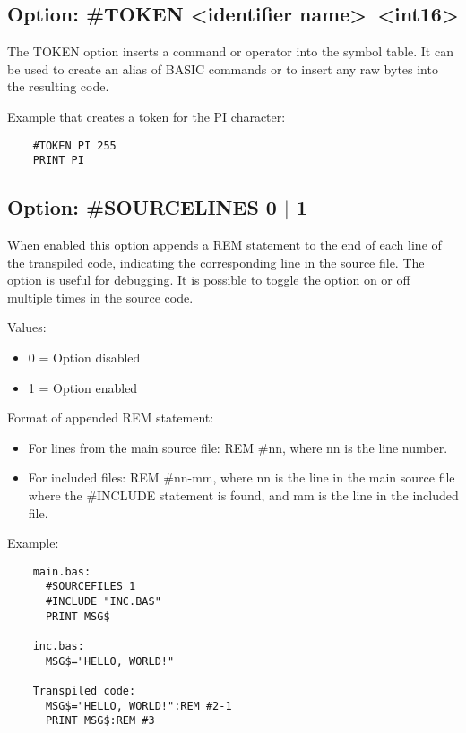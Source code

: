 \documentclass{article}
\begin{document}
    \subsection{Option: \#TOKEN \textless identifier name\textgreater \  \textless int16\textgreater }
        The TOKEN option inserts a command or operator into the symbol table. It can be used
        to create an alias of BASIC commands or to insert any raw bytes into the resulting
        code.

        Example that creates a token for the PI character:

        \begin{verbatim}
    #TOKEN PI 255
    PRINT PI
         \end{verbatim}

    \subsection{Option: \#SOURCELINES 0 $|$ 1}
        When enabled this option appends a REM statement to the end of each line of the
        transpiled code, indicating the corresponding line in the source file. 
        The option is useful for debugging. It is possible to toggle the option on or off multiple times 
        in the source code.

        Values:
        \begin{itemize}
            \item 0 = Option disabled
            \item 1 = Option enabled
        \end{itemize}

        Format of appended REM statement:
        \begin{itemize}
            \item For lines from the main source file: REM \#nn, where nn is the line number.
            \item For included files: REM \#nn-mm, where nn is the line in the main source file
            where the \#INCLUDE statement is found, and mm is the line in the included file.
        \end{itemize}

        Example:
        \begin{verbatim}
    main.bas:
      #SOURCEFILES 1
      #INCLUDE "INC.BAS"
      PRINT MSG$

    inc.bas:
      MSG$="HELLO, WORLD!"
    
    Transpiled code:
      MSG$="HELLO, WORLD!":REM #2-1
      PRINT MSG$:REM #3
         \end{verbatim}
    
\end{document}
